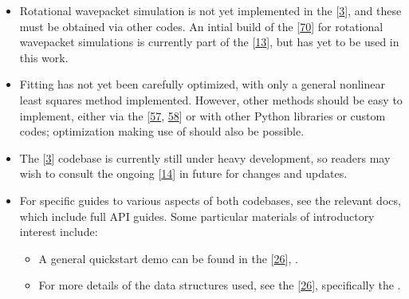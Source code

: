 \documentclass[letterpaper,table,10pt,english]{jupyterBook}
\begin{document}
\begin{itemize}
\item {} 
\sphinxAtStartPar
Rotational wavepacket simulation is not yet implemented in the  {[}\hyperlink{cite.backmatter/bibliography:id668}{3}{]}, and these must be obtained via other codes. An intial build of the  {[}\hyperlink{cite.backmatter/bibliography:id919}{70}{]} for rotational wavepacket simulations is currently part of the  {[}\hyperlink{cite.backmatter/bibliography:id671}{13}{]}, but has yet to be used in this work.

\item {} 
\sphinxAtStartPar
Fitting has not yet been carefully optimized, with only a general non\sphinxhyphen{}linear least squares method implemented. However, other methods should be easy to implement, either via the  {[}\hyperlink{cite.backmatter/bibliography:id741}{57}, \hyperlink{cite.backmatter/bibliography:id787}{58}{]} or with other Python libraries or custom codes; optimization making use of  should also be possible.

\item {} 
\sphinxAtStartPar
The  {[}\hyperlink{cite.backmatter/bibliography:id668}{3}{]} codebase is currently still under heavy development, so readers may wish to consult the ongoing  {[}\hyperlink{cite.backmatter/bibliography:id667}{14}{]} in future for changes and updates.

\item {} 
\sphinxAtStartPar
For specific guides to various aspects of both codebases, see the relevant docs, which include full API guides. Some particular materials of introductory interest include:
\begin{itemize}
\item {} 
\sphinxAtStartPar
A general quick\sphinxhyphen{}start demo can be found in the  {[}\hyperlink{cite.backmatter/bibliography:id595}{26}{]}, .

\item {} 
\sphinxAtStartPar
For more details of the data structures used, see the  {[}\hyperlink{cite.backmatter/bibliography:id595}{26}{]}, specifically the .

\end{itemize}

\end{itemize}
\end{document}
